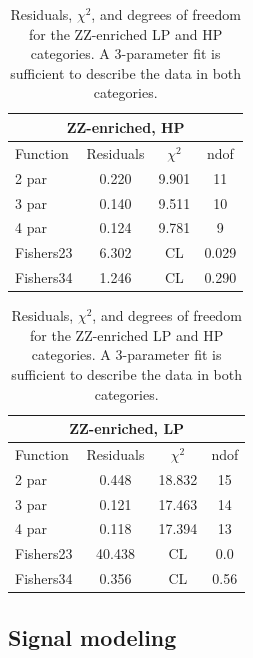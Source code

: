 \begin{table}[h!]
\centering
\begin{tabular}{|l c c c |}
\hline
\multicolumn{4}{|c|}{ZZ-enriched, HP}\\
\hline
Function & Residuals & $\chi^2$ & ndof \\
\hline
2 par & 0.220 & 9.901 & 11 \\
3 par & 0.140 & 9.511 & 10 \\
4 par & 0.124 & 9.781 & 9 \\
\hline
\hline
Fishers23 & 6.302& CL & 0.029\\
Fishers34 & 1.246& CL & 0.290\\
\hline
\end{tabular}
\quad
\begin{tabular}{|l c c c |}
\hline
\multicolumn{4}{|c|}{ZZ-enriched, LP}\\
\hline
Function & Residuals & $\chi^2$ & ndof \\
\hline
2 par & 0.448 & 18.832 & 15 \\
3 par & 0.121 & 17.463 & 14 \\
4 par & 0.118 & 17.394 & 13 \\
\hline
\hline
Fishers23 & 40.438& CL & 0.0\\
Fishers34 & 0.356& CL & 0.56\\
\hline
\end{tabular}
\caption{Residuals, $\chi^{2}$, and degrees of freedom for the ZZ-enriched LP and HP categories. A 3-parameter fit is sufficient to describe the data in both categories.}
\label{tab:ZZ_enriched}
\end{table}

\clearpage
\subsection{Signal modeling}
\label{sec:searchI:sig}


